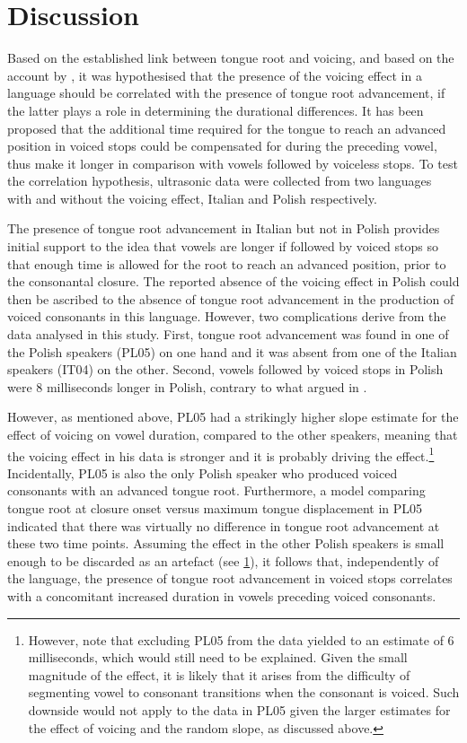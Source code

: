 \documentclass[authoryear, twocolumn]{elsarticle}
\begin{document}
\section{Discussion}\label{discussion}

Based on the established link between tongue root and voicing, and based
on the account by \citet{halle1967}, it was hypothesised that the
presence of the voicing effect in a language should be correlated with
the presence of tongue root advancement, if the latter plays a role in
determining the durational differences. It has been proposed that the
additional time required for the tongue to reach an advanced position in
voiced stops could be compensated for during the preceding vowel, thus
make it longer in comparison with vowels followed by voiceless stops. To
test the correlation hypothesis, ultrasonic data were collected from two
languages with and without the voicing effect, Italian and Polish
respectively.

The presence of tongue root advancement in Italian but not in Polish
provides initial support to the idea that vowels are longer if followed
by voiced stops so that enough time is allowed for the root to reach an
advanced position, prior to the consonantal closure. The reported
absence of the voicing effect in Polish could then be ascribed to the
absence of tongue root advancement in the production of voiced
consonants in this language. However, two complications derive from the
data analysed in this study. First, tongue root advancement was found in
one of the Polish speakers (PL05) on one hand and it was absent from one
of the Italian speakers (IT04) on the other. Second, vowels followed by
voiced stops in Polish were 8 milliseconds longer in Polish, contrary to
what argued in \citet{keating1984}.

However, as mentioned above, PL05 had a strikingly higher slope estimate
for the effect of voicing on vowel duration, compared to the other
speakers, meaning that the voicing effect in his data is stronger and it
is probably driving the
effect.\footnote{\label{fn:polish-small} However, note that excluding PL05 from the data yielded to an estimate of 6 milliseconds, which would still need to be explained. Given the small magnitude of the effect, it is likely that it arises from the difficulty of segmenting vowel to consonant transitions when the consonant is voiced. Such downside would not apply to the data in PL05 given the larger estimates for the effect of voicing and the random slope, as discussed above.}
Incidentally, PL05 is also the only Polish speaker who produced voiced
consonants with an advanced tongue root. Furthermore, a model comparing
tongue root at closure onset versus maximum tongue displacement in PL05
indicated that there was virtually no difference in tongue root
advancement at these two time points. Assuming the effect in the other
Polish speakers is small enough to be discarded as an artefact (see
\cref{fn:polish-small}), it follows that, independently of the language,
the presence of tongue root advancement in voiced stops correlates with
a concomitant increased duration in vowels preceding voiced consonants.
\end{document}
